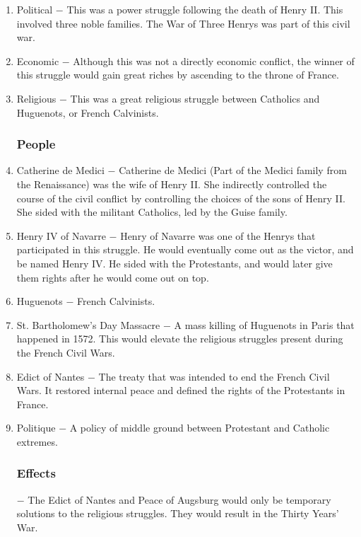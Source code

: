 \documentclass[12pt]{article}
\begin{document}
\begin{enumerate}
\item Political $-$ This was a power struggle following the death of Henry II. This involved three noble families. The War of Three Henrys was part of this civil war.

\item Economic $-$ Although this was not a directly economic conflict, the winner of this struggle would gain great riches by ascending to the throne of France. 

\item Religious $-$ This was a great religious struggle between Catholics and Huguenots, or French Calvinists.

\subsubsection{People}

\item Catherine de Medici $-$ Catherine de Medici (Part of the Medici family from the Renaissance) was the wife of Henry II. She indirectly controlled the course of the civil conflict by controlling the choices of the sons of Henry II. She sided with the militant Catholics, led by the Guise family.

\item Henry IV of Navarre $-$ Henry of Navarre was one of the Henrys that participated in this struggle. He would eventually come out as the victor, and be named Henry IV. He sided with the Protestants, and would later give them rights after he would come out on top.

\item Huguenots $-$ French Calvinists.

\item St. Bartholomew's Day Massacre $-$ A mass killing of Huguenots in Paris that happened in 1572. This would elevate the religious struggles present during the French Civil Wars.

\item Edict of Nantes $-$ The treaty that was intended to end the French Civil Wars. It restored internal peace and defined the rights of the Protestants in France. 

\item Politique $-$ A policy of middle ground between Protestant and Catholic extremes.

\subsubsection{Effects} $-$ The Edict of Nantes and Peace of Augsburg would only be temporary solutions to the religious struggles. They would result in the Thirty Years' War.


\end{enumerate}
\end{document}
